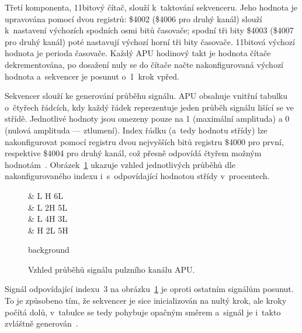 Třetí komponenta, 11bitový čítač, slouží k~taktování sekvenceru. Jeho hodnota je upravována pomocí dvou registrů: \$4002 (\$4006 pro druhý kanál) slouží k~nastavení výchozích spodních osmi bitů časovače; spodní tři bity \$4003 (\$4007 pro druhý kanál) poté nastavují výchozí horní tři bity časovače. 11bitová výchozí hodnota je perioda časovače. Každý APU hodinový takt je hodnota čítače dekrementována, po dosažení nuly se do čítače načte nakonfigurovaná výchozí hodnota a~sekvencer je posunut o~1~krok vpřed.~\cite{Nesdev:apu-pulse}

Sekvencer slouží ke generování průběhu signálu. APU obsahuje vnitřní tabulku o~čtyřech řádcích, kdy každý řádek reprezentuje jeden průběh signálu lišící se ve střídě. Jednotlivé hodnoty jsou omezeny pouze na 1 (maximální amplituda) a 0 (nulová amplituda --- ztlumení). Index řádku (a~tedy hodnotu střídy) lze nakonfigurovat pomocí registru dvou nejvyšších bitů registru \$4000 pro první, respektive \$4004 pro druhý kanál, což přesně odpovídá čtyřem možným hodnotám~\cite{Nesdev:apu-pulse}. Obrázek~\ref{fig:apu-signaly} ukazuje vzhled jednotlivých průběhů dle nakonfigurovaného indexu i~s~odpovídající hodnotou střídy v~procentech.

\begin{figure}[ht!]
	\centering
	\begin{tikztimingtable}[%
		timing/dslope=0.1,
		timing/.style={x=5ex,y=3ex},
		x=5ex,
		timing/rowdist=4ex,
		timing/name/.style={font=\sffamily\scriptsize}
		]
		 & L H 6L \\
		 & L 2H 5L \\
		 & L 4H 3L \\
		 & H 2L 5H \\
		\extracode
		\begin{pgfonlayer}{background}
			\begin{scope}
			\end{scope}
		\end{pgfonlayer}
	\end{tikztimingtable}
	\caption{Vzhled průběhů signálu pulzního kanálu APU.}\label{fig:apu-signaly}
\end{figure}

\begin{note}
	Signál odpovídající indexu~3 na obrázku~\ref{fig:apu-signaly} je oproti ostatním signálům posunut. To je způsobeno tím, že sekvencer je sice inicializován na nultý krok, ale kroky počítá dolů, v~tabulce se tedy pohybuje opačným směrem a~signál je i~takto zvláštně generován~.
\end{note}

